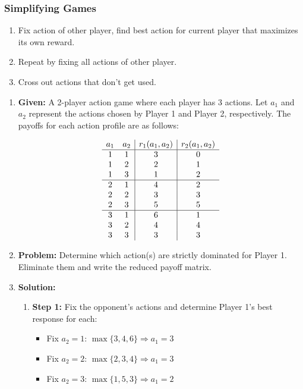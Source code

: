 \subsubsection{Simplifying Games}
\begin{process}
    \begin{enumerate}
        \item Fix action of other player, find best action for current player that maximizes its own reward. 
        \item Repeat by fixing all actions of other player. 
        \item Cross out actions that don't get used. 
    \end{enumerate}
\end{process}

\begin{example}
    \begin{enumerate}
        \item \textbf{Given:} A 2-player action game where each player has 3 actions. Let $a_1$ and $a_2$ represent the actions chosen by Player 1 and Player 2, respectively. The payoffs for each action profile are as follows:
    
        \[
        \begin{array}{c c | c | c}
        a_1 & a_2 & r_1(a_1, a_2) & r_2(a_1, a_2) \\
        \hline
        1 & 1 & 3 & 0 \\
        1 & 2 & 2 & 1 \\
        1 & 3 & 1 & 2 \\
        \hline
        2 & 1 & 4 & 2 \\
        2 & 2 & 3 & 3 \\
        2 & 3 & 5 & 5 \\
        \hline
        3 & 1 & 6 & 1 \\
        3 & 2 & 4 & 4 \\
        3 & 3 & 3 & 3 \\
        \end{array}
        \]
    
        \item \textbf{Problem:} Determine which action(s) are strictly dominated for Player 1. Eliminate them and write the reduced payoff matrix.
    
        \item \textbf{Solution:}
    
        \begin{enumerate}
            \item \textbf{Step 1:} Fix the opponent's actions and determine Player 1's best response for each:
            \begin{itemize}
                \item Fix $a_2 = 1$: $\max\{3, 4, 6\} \Rightarrow a_1 = 3$
                \item Fix $a_2 = 2$: $\max\{2, 3, 4\} \Rightarrow a_1 = 3$
                \item Fix $a_2 = 3$: $\max\{1, 5, 3\} \Rightarrow a_1 = 2$
            \end{itemize}
        

\end{enumerate}
\end{enumerate}
\end{example}
